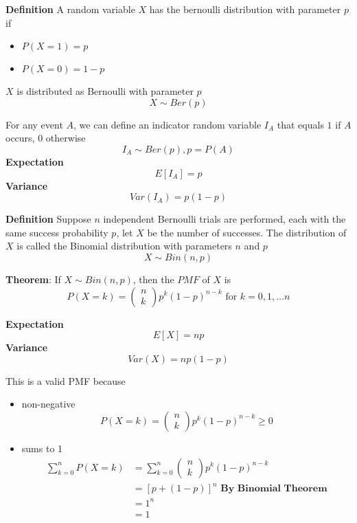 \begin{framed}
   \textbf{Definition} A random variable $X$ has the bernoulli distribution with parameter $p$ if
   \begin{itemize}
      \item $P(X=1) = p$
      \item $P(X=0) = 1-p$
   \end{itemize}

   $X$ is distributed as Bernoulli with parameter $p$ \[
     X \sim Ber(p)
   \] 


   For any event $A$, we can define an indicator random variable $I_A$ that equals $1$ if $A$ occurs, $0$ otherwise
   \[
     I_A \sim Ber(p), p = P(A)
   \] 
   \textbf{Expectation}
   \[
      E[I_A] = p
   \] 
   \textbf{Variance}
   \[
      Var(I_A) = p(1-p)
   \] 
\end{framed}

\begin{framed}
   \textbf{Definition} Suppose $n$ independent Bernoulli trials are performed, each with the same success probability $p$, let $X$ be the number of successes. The distribution of $X$ is called the Binomial distribution with parameters $n$ and $p$
   \[
     X \sim Bin(n, p)
   \] 

   \textbf{Theorem}: If $X \sim Bin(n, p)$, then the  $PMF$ of $X$ is
   \[
      P(X = k) = \begin{pmatrix} n \\ k \end{pmatrix}  p^k (1-p)^{n-k} \text{ for $k = 0, 1, \hdots n$}
   \] 

   \textbf{Expectation}
   \[
      E[X] = np
   \] 
   \textbf{Variance}
   \[
      Var(X) = np(1-p)
   \] 

   This is a valid PMF because \\
   \begin{itemize}
      \item non-negative
         \[
            P(X = k) = \begin{pmatrix} n \\ k \end{pmatrix} p^k (1-p)^{n-k} \geq 0
         \] 
      \item sums to 1
         \begin{align*}
            \sum_{k = 0}^{n} P(X = k) &= \sum_{k = 0}^{n} \begin{pmatrix} n \\ k \end{pmatrix}  p^k (1-p)^{n-k} \\
                                      &= [p + (1-p)]^n \textbf{ By Binomial Theorem}\\
                                      &= 1^n  \\
                                      &= 1
         \end{align*}
   \end{itemize}
\end{framed}

